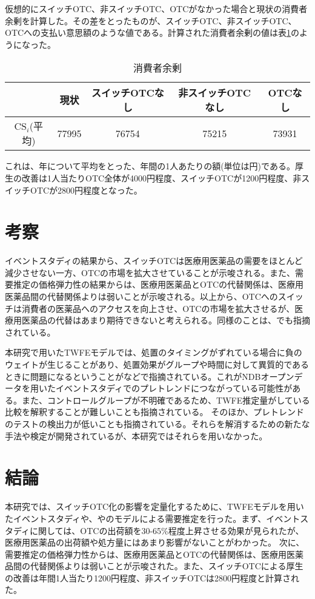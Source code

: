 \documentclass[a4paper,11pt,uplatex]{jsarticle}
\theoremstyle{definition}
\begin{document}
仮想的にスイッチOTC、非スイッチOTC、OTCがなかった場合と現状の消費者余剰を計算した。その差をとったものが、スイッチOTC、非スイッチOTC、OTCへの支払い意思額のような値である。計算された消費者余剰の値は表\ref{consumer_surplus}のようになった。
\begin{table}[H]\centering \caption{消費者余剰}\label{consumer_surplus}
    \begin{tabular}{ccccc}
        \hline
        &現状 & スイッチOTCなし & 非スイッチOTCなし & OTCなし \\
        \hline
        \(\textrm{CS}_i\)(平均)&77995 & 76754 & 75215 & 73931\\
        \hline
    \end{tabular}
\end{table}
これは、年について平均をとった、年間の1人あたりの額(単位は円)である。厚生の改善は1人当たりOTC全体が4000円程度、スイッチOTCが1200円程度、非スイッチOTCが2800円程度となった。
\section{考察}
イベントスタディの結果から、スイッチOTCは医療用医薬品の需要をほとんど減少させない一方、OTCの市場を拡大させていることが示唆される。また、需要推定の価格弾力性の結果からは、医療用医薬品とOTCの代替関係は、医療用医薬品間の代替関係よりは弱いことが示唆される。以上から、OTCへのスイッチは消費者の医薬品へのアクセスを向上させ、OTCの市場を拡大させるが、医療用医薬品の代替はあまり期待できないと考えられる。同様のことは、\cite{Stomberg2013}でも指摘されている。

本研究で用いたTWFEモデルでは、処置のタイミングがずれている場合に負のウェイトが生じることがあり、処置効果がグループや時間に対して異質的であるときに問題になるということが\cite{ROTH2023}などで指摘されている。これがNDBオープンデータを用いたイベントスタディでのプレトレンドにつながっている可能性がある。また、コントロールグループが不明確であるため、TWFE推定量がしている比較を解釈することが難しいことも指摘されている。
そのほか、プレトレンドのテストの検出力が低いことも指摘されている。それらを解消するための新たな手法や検定が開発されているが、本研究ではそれらを用いなかった。
\section{結論}
本研究では、スイッチOTC化の影響を定量化するために、TWFEモデルを用いたイベントスタディや、\cite{Berry1994}や\cite{BLP}のモデルによる需要推定を行った。まず、イベントスタディに関しては、OTCの出荷額を30-65\%程度上昇させる効果が見られたが、医療用医薬品の出荷額や処方量にはあまり影響がないことがわかった。
次に、需要推定の価格弾力性からは、医療用医薬品とOTCの代替関係は、医療用医薬品間の代替関係よりは弱いことが示唆された。また、スイッチOTCによる厚生の改善は年間1人当たり1200円程度、非スイッチOTCは2800円程度と計算された。
\end{document}
